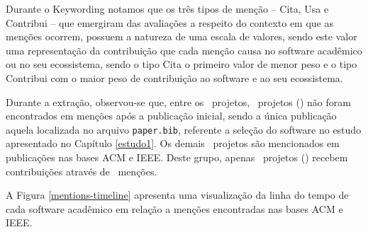 Durante o Keywording notamos que os três tipos de menção -- Cita, Usa e
Contribui -- que emergiram das avaliações a respeito do contexto em que as
menções ocorrem, possuem a natureza de uma escala de valores, sendo este valor
uma representação da contribuição que cada menção causa no software acadêmico
ou no seu ecossistema, sendo o tipo Cita o primeiro valor de menor peso e o
tipo Contribui com o maior peso de contribuição ao software e ao seu
ecossistema.

Durante a extração, observou-se que, 
entre os \SoftwareCount \ projetos, \SoftwareNotMentionedCount \ projetos
() não foram encontrados em menções
após a publicação inicial, sendo a única publicação aquela localizada no
arquivo \texttt{paper.bib}, referente a seleção do software no estudo
apresentado no Capítulo \ref{estudo1}.
%
Os demais \MentionsStudyDois \ projetos são mencionados em publicações nas
bases ACM e IEEE. Deste grupo, apenas \ContributeStudyDoisSoftware \ projetos
() recebem contribuições através de
\ContributeStudyDoisCount \ menções.

A Figura \ref{mentions-timeline} apresenta uma visualização da linha do tempo
de cada software acadêmico em relação a menções encontradas nas bases ACM e IEEE.

